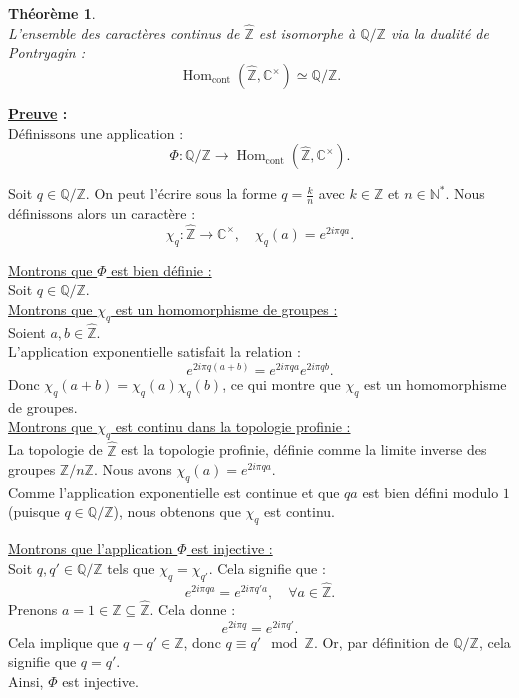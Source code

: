 \documentclass[a4paper, 14pt]{report}
\newtheorem{theorem}{Théorème}[section]
\begin{document}
\begin{onehalfspace}
{\begin{theorem} \cite{ribes-zalesskii}\\
L'ensemble des caractères continus de $\widehat{\mathbb{Z}}$ est isomorphe à $\mathbb{Q}/\mathbb{Z}$ via la dualité de Pontryagin :
	\[
	\operatorname{Hom}_{\text{cont}}(\widehat{\mathbb{Z}}, \mathbb{C}^\times) \simeq \mathbb{Q}/\mathbb{Z}.
	\]
\end{theorem}

\textbf{\underline{Preuve} :}\\
Définissons une application :
\[
\Phi : \mathbb{Q}/\mathbb{Z} \to \operatorname{Hom}_{\text{cont}}(\widehat{\mathbb{Z}}, \mathbb{C}^\times).
\]

Soit $q \in \mathbb{Q}/\mathbb{Z}$. On peut l'écrire sous la forme $q = \frac{k}{n}$ avec $k \in \mathbb{Z}$ et $n \in \mathbb{N}^*$. Nous définissons alors un caractère :
\[
\chi_q : \widehat{\mathbb{Z}} \to \mathbb{C}^\times, \quad \chi_q(a) = e^{2i\pi q a}.
\]

\underline{Montrons que $\Phi$ est bien définie :}\\
Soit \(q \in \mathbb{Q}/\mathbb{Z} \).\\
\underline{Montrons que $\chi_q$ est un homomorphisme de groupes :}\\
Soient $a, b \in \widehat{\mathbb{Z}}$.\\
L'application exponentielle satisfait la relation :
\[
e^{2i\pi q (a + b)} = e^{2i\pi q a} e^{2i\pi q b}.
\]
Donc $\chi_q(a + b) = \chi_q(a) \chi_q(b)$, ce qui montre que $\chi_q$ est un homomorphisme de groupes.\\

\underline{Montrons que $\chi_q$ est continu dans la topologie profinie :}\\
La topologie de $\widehat{\mathbb{Z}}$ est la topologie profinie, définie comme la limite inverse des groupes $\mathbb{Z}/n\mathbb{Z}$. Nous avons $\chi_q(a) = e^{2i\pi q a}$. \\
Comme l'application exponentielle est continue et que $q a$ est bien défini modulo $1$ (puisque $q \in \mathbb{Q}/\mathbb{Z}$), nous obtenons que $\chi_q$ est continu.


\underline{Montrons que l'application $\Phi$ est injective :}\\
Soit $q, q' \in \mathbb{Q}/\mathbb{Z}$ tels que $\chi_q = \chi_{q'}$. Cela signifie que :
\[
e^{2i\pi q a} = e^{2i\pi q' a}, \quad \forall a \in \widehat{\mathbb{Z}}.
\]
Prenons $a = 1 \in \mathbb{Z} \subseteq \widehat{\mathbb{Z}}$. Cela donne :
\[
e^{2i\pi q} = e^{2i\pi q'}.
\]
Cela implique que $q - q' \in \mathbb{Z}$, donc $q \equiv q' \mod \mathbb{Z}$. Or, par définition de $\mathbb{Q}/\mathbb{Z}$, cela signifie que $q = q'$.\\ 
Ainsi, $\Phi$ est injective.

}
\end{onehalfspace}
\end{document}
